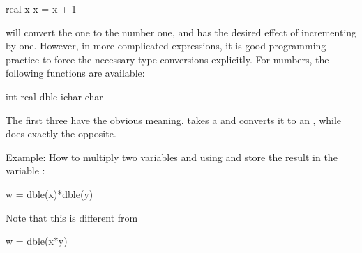 \begin{fortran77}
      real x
      x = x + 1
\end{fortran77}

will convert the  one to the
 number one, and has the desired effect of
incrementing  by one. However, in more complicated
expressions, it is good programming practice to force the necessary type
conversions explicitly. For numbers, the following functions are
available:

\begin{fortran77}
      int
      real
      dble
      ichar
      char
\end{fortran77}

The first three have the obvious meaning.  takes
a  and converts it to an
, while  does exactly the
opposite.

Example: How to multiply two  variables
 and  using
 and store the result in the
 variable :

\begin{fortran77}
      w = dble(x)*dble(y)
\end{fortran77}

Note that this is different from

\begin{fortran77}
      w = dble(x*y)
\end{fortran77}

\footer
